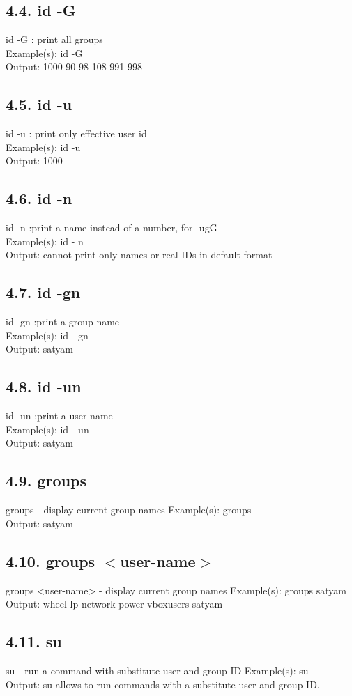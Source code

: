 \documentclass[11pt,a4]{article}
\begin{document}
\begin{enumerate}
\subsection*{4.4. id -G}
id -G : print all groups\\
Example(s): id -G \\
Output: 1000 90 98 108 991 998
\subsection*{4.5. id -u}
id -u : print only effective user id\\
Example(s): id -u \\
Output: 1000
\subsection*{4.6. id -n}
id -n :print a name instead of a number, for -ugG\\
Example(s): id - n\\
Output: cannot print only names or real IDs in default format

\subsection*{4.7. id -gn}
id -gn :print a group name\\
Example(s): id - gn\\
Output:  satyam
\subsection*{4.8. id -un}
id -un :print a user name\\
Example(s): id - un\\
Output: satyam
\subsection*{4.9. groups}
groups - display current group names
Example(s): groups\\
Output: satyam
\subsection*{4.10. groups $<$user-name$>$}
groups <user-name> - display current group names
Example(s): groups satyam\\
Output: wheel lp network power vboxusers satyam 

\subsection*{4.11. su}
su - run a command with substitute user and group ID
Example(s): su\\
Output: su allows to run commands with a substitute user and group ID.


\end{enumerate}
\end{document}
